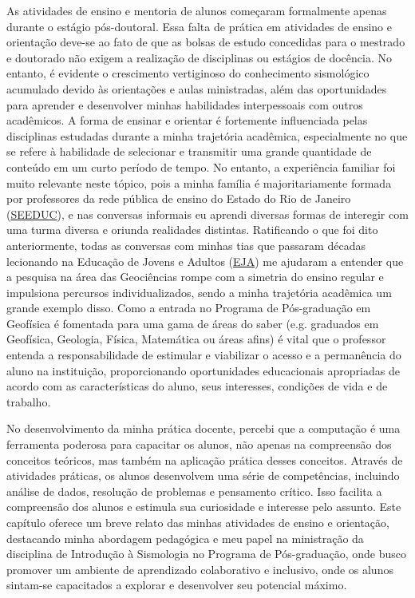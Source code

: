 \documentclass[10pt,a4paper,oneside]{book}
\begin{document}
As atividades de ensino e mentoria de alunos começaram formalmente apenas durante o estágio pós-doutoral. Essa falta de prática em atividades de ensino e orientação deve-se ao fato de que as bolsas de estudo concedidas para o mestrado e doutorado não exigem a realização de disciplinas ou estágios de docência. No entanto, é evidente o crescimento vertiginoso do conhecimento sismológico acumulado devido às orientações e aulas ministradas, além das oportunidades para aprender e desenvolver minhas habilidades interpessoais com outros acadêmicos. A forma de ensinar e orientar é fortemente influenciada pelas disciplinas estudadas durante a minha trajetória acadêmica, especialmente no que se refere à habilidade de selecionar e transmitir uma grande quantidade de conteúdo em um curto período de tempo. No entanto, a experiência familiar foi muito relevante neste tópico, pois a minha família é majoritariamente formada por professores da rede pública de ensino do Estado do Rio de Janeiro (\href{https://www.seeduc.rj.gov.br/}{SEEDUC}), e nas conversas informais eu aprendi diversas formas de interegir com uma turma diversa e oriunda realidades distintas. Ratificando o que foi dito anteriormente, todas as conversas com minhas tias que passaram décadas lecionando na Educação de Jovens e Adultos (\href{http://portal.mec.gov.br/index.php?option=com_docman&view=download&alias=13448-diretrizes-curiculares-nacionais-2013-pdf&Itemid=30192}{EJA}) me ajudaram a entender que a pesquisa na área das Geociências rompe com a simetria do ensino regular e impulsiona percursos individualizados, sendo a minha trajetória acadêmica um grande exemplo disso. Como a entrada no Programa de Pós-graduação em Geofísica é fomentada para uma gama de áreas do saber (e.g. graduados em Geofísica, Geologia, Física, Matemática ou áreas afins) é vital que o professor entenda a responsabilidade de estimular e viabilizar o acesso e a permanência do aluno na instituição, proporcionando oportunidades educacionais apropriadas de acordo com as características do aluno, seus interesses, condições de vida e de trabalho.

No desenvolvimento da minha prática docente, percebi que a computação é uma ferramenta poderosa para capacitar os alunos, não apenas na compreensão dos conceitos teóricos, mas também na aplicação prática desses conceitos. Através de atividades práticas, os alunos desenvolvem uma série de competências, incluindo análise de dados, resolução de problemas e pensamento crítico. Isso facilita a compreensão dos alunos e estimula sua curiosidade e interesse pelo assunto. Este capítulo oferece um breve relato das minhas atividades de ensino e orientação, destacando minha abordagem pedagógica e meu papel na ministração da disciplina de Introdução à Sismologia no Programa de Pós-graduação, onde busco promover um ambiente de aprendizado colaborativo e inclusivo, onde os alunos sintam-se capacitados a explorar e desenvolver seu potencial máximo.
\end{document}

